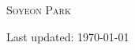 \documentclass[10pt,letterpaper]{article}
\def\name{\textsc{Soyeon Park}}
\begin{document}
{\Huge \name}


\vspace{0.15in}


% 









%


% 
% 


\begin{center}
  \begin{small}
    Last updated: \today
  \end{small}
\end{center}
\end{document}
